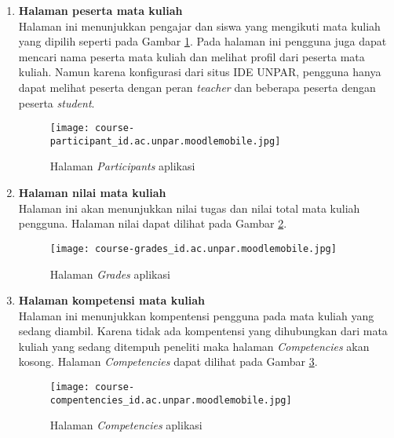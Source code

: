 \begin{enumerate}
\item \textbf{Halaman peserta mata kuliah} \\
Halaman ini menunjukkan pengajar dan siswa yang mengikuti mata kuliah yang dipilih seperti pada Gambar \ref{app:participants}. Pada halaman ini pengguna juga dapat mencari nama peserta mata kuliah dan melihat profil dari peserta mata kuliah. Namun karena konfigurasi dari situs IDE UNPAR, pengguna hanya dapat melihat peserta dengan peran \textit{teacher} dan beberapa peserta dengan peserta \textit{student}. 

\begin{figure}[H] 
	\centering  
	\texttt{[image: course-participant\_id.ac.unpar.moodlemobile.jpg]}  
	\caption[Halaman \textit{Participants} aplikasi] {Halaman \textit{Participants} aplikasi} 
	\label{app:participants} 
\end{figure}  

\item \textbf{Halaman nilai mata kuliah} \\
Halaman ini akan menunjukkan nilai tugas dan nilai total mata kuliah pengguna. Halaman nilai dapat dilihat pada Gambar \ref{app:grades}.

\begin{figure}[H] 
	\centering  
	\texttt{[image: course-grades\_id.ac.unpar.moodlemobile.jpg]}  
	\caption[Halaman \textit{Grades} aplikasi] {Halaman \textit{Grades} aplikasi} 
	\label{app:grades} 
\end{figure}  


\item \textbf{Halaman kompetensi mata kuliah} \\
Halaman ini menunjukkan kompentensi pengguna pada mata kuliah yang sedang diambil. Karena tidak ada kompentensi yang dihubungkan dari mata kuliah yang sedang ditempuh peneliti maka halaman \textit{Competencies} akan kosong. Halaman \textit{Competencies} dapat dilihat pada Gambar \ref{app:competencies}.

\begin{figure}[H] 
	\centering  
	\texttt{[image: course-compentencies\_id.ac.unpar.moodlemobile.jpg]}  
	\caption[Halaman \textit{Competencies} aplikasi] {Halaman \textit{Competencies} aplikasi} 
	\label{app:competencies} 
\end{figure}  

\end{enumerate}

